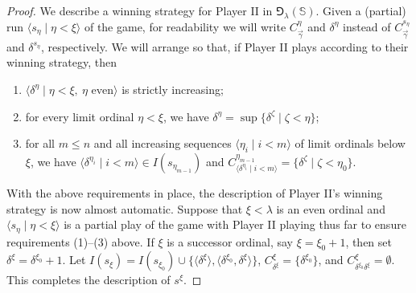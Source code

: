 \documentclass{amsart}
\numberwithin{theorem}{section}
\theoremstyle{definition}
\newcommand{\bb}{\mathbb}
\begin{document}
\begin{proof}
  We describe a winning strategy for Player II in $\Game_\lambda(\bb{S})$. 
  Given a (partial) run $\langle s_\eta \mid \eta < \xi \rangle$ of the game, 
  for readability we will write $C^\eta_{\vec{\gamma}}$ and $\delta^\eta$ 
  instead of $C^{s_\eta}_{\vec{\gamma}}$ and $\delta^{s_\eta}$, respectively. 
  We will arrange so that, if Player II plays according to their winning strategy, 
  then
  \begin{enumerate}
    \item $\langle \delta^\eta \mid \eta < \xi, ~ \eta \textrm{ even}\rangle$ 
    is strictly increasing;
    \item for every limit ordinal $\eta < \xi$, we have $\delta^\eta = 
    \sup\{\delta^\zeta \mid \zeta < \eta\}$;
    \item for all $m \leq n$ and all increasing sequences $\langle \eta_i 
    \mid i < m \rangle$ of limit ordinals below $\xi$, we have 
    $\langle \delta^{\eta_i} \mid i < m \rangle \in I(s_{\eta_{m-1}})$ and
    $C^{\eta_{m-1}}_{\langle \delta^{\eta_i} \mid i < m \rangle} = 
    \{\delta^\zeta \mid \zeta < \eta_0\}$.
  \end{enumerate}
  
  With the above requirements in place, the description of Player II's winning 
  strategy is now almost automatic. Suppose that $\xi < \lambda$ is an even 
  ordinal and $\langle s_\eta \mid \eta < \xi \rangle$ is a partial play of 
  the game with Player II playing thus far to ensure requirements (1)--(3) 
  above. If $\xi$ is a successor ordinal, say $\xi = \xi_0 + 1$, then 
  set $\delta^\xi = \delta^{\xi_0}+1$. Let $I(s_\xi) = I(s_{\xi_0}) \cup 
  \{\langle \delta^\xi \rangle, \langle \delta^{\xi_0},\delta^\xi \rangle\}$, 
  $C^\xi_{\delta^\xi} = \{\delta^{\xi_0}\}$, and $C^\xi_{\delta^{\xi_0}\delta^\xi} 
  = \emptyset$.  This completes the description of $s^\xi$. 
  

\end{proof}
\end{document}
